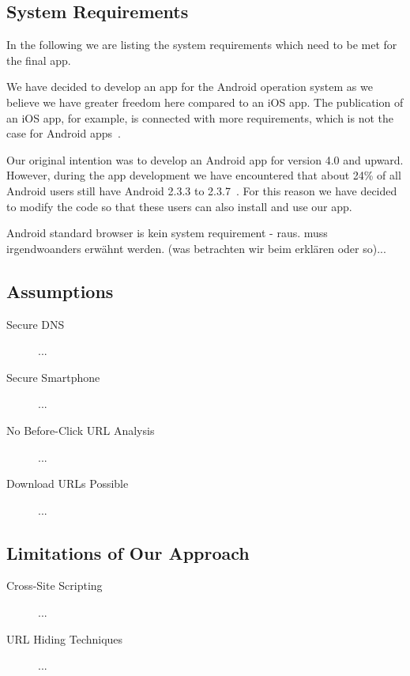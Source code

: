 \subsection{System Requirements}
In the following we are listing the system requirements which need to be met for the final app.

\begin{description}[leftmargin=0cm]
	\item[Android] We have decided to develop an app for the Android operation system as we believe we have greater freedom here compared to an iOS app. The publication of an iOS app, for example, is connected with more requirements, which is not the case for Android apps~\cite{publishios, publishandroid}.
	\item[Version] Our original intention was to develop an Android app for version 4.0 and upward. However, during the app development we have encountered that about 24\% of all Android users still have Android 2.3.3 to 2.3.7~\cite{}. For this reason we have decided to modify the code so that these users can also install and use our app. 
	\item[Android Standard Browser] Android standard browser is kein system requirement - raus. muss irgendwoanders erwähnt werden. (was betrachten wir beim erklären oder so)...
\end{description}

\subsection{Assumptions}
\begin{description}
	\item[Secure DNS] ...
	\item[Secure Smartphone] ...
	\item[No Before-Click URL Analysis] ...
	\item[Download URLs Possible] ...
\end{description}

\subsection{Limitations of Our Approach}
\begin{description}
	\item[Cross-Site Scripting] ...
	\item[URL Hiding Techniques] ...
\end{description}

